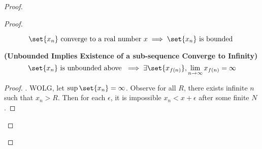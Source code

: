 \documentclass{report}
\begin{document}
\begin{proof}
\begin{proof}
\begin{theorem}
\begin{equation}
\set{x_n}\text{ converge to a real number $x$}\implies \set{x_n}\text{ is bounded }
\end{equation}
\end{theorem}
\begin{corollary}
\label{4.1.4}
\textbf{(Unbounded Implies Existence of a sub-sequence Converge to Infinity)}
\begin{equation}
\set{x_n}\text{ is unbounded above }\implies \exists \set{x_{f(n)}}, \lim_{n\to\infty}x_{f(n)}=\infty
\end{equation}
\end{corollary}
\begin{proof}
. WOLG, let $\sup \set{x_n}=\infty$. Observe for all $R$, there exists infinite $n$ such that  $x_n>R$. Then for each $\epsilon $, it is impossible $x_n<x+\epsilon $ after some finite $N$.  \CaC
\end{proof}
\end{proof}
\end{proof}
\end{document}
